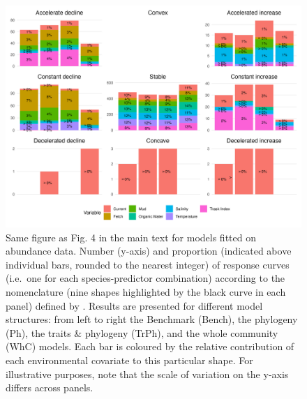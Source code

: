 \begin{figure}
\hypertarget{fig:chapt1supp26}{%
\centering
\includegraphics{03-Chapitre1/figures/supplementary/fig_supp26.png}
\caption{Same figure as Fig. 4 in the main text for models fitted on
abundance data. Number (y-axis) and proportion (indicated above
individual bars, rounded to the nearest integer) of response curves
(i.e.~one for each species-predictor combination) according to the
nomenclature (nine shapes highlighted by the black curve in each panel)
defined by \textcite{Rigal_2020}. Results are presented for different
model structures: from left to right the Benchmark (Bench), the
phylogeny (Ph), the traits \& phylogeny (TrPh), and the whole community
(WhC) models. Each bar is coloured by the relative contribution of each
environmental covariate to this particular shape. For illustrative
purposes, note that the scale of variation on the y-axis differs across
panels.}\label{fig:chapt1supp26}
}
\end{figure}

